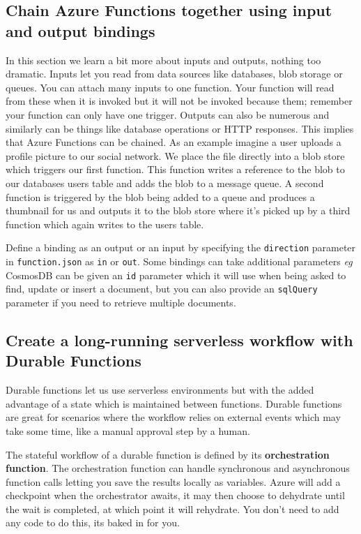 \documentclass{article}
\newcommand{\code}{\texttt}
\begin{document}
\subsection{Chain Azure Functions together using input and output bindings}
In this section we learn a bit more about inputs and outputs, nothing too dramatic. Inputs let you read from data sources like databases, blob storage or queues. You can attach many inputs to one function. Your function will read from these when it is invoked but it will not be invoked because them; remember your function can only have one trigger. Outputs can also be numerous and similarly can be things like database operations or HTTP responses. This implies that Azure Functions can be chained. As an example imagine a user uploads a profile picture to our social network. We place the file directly into a blob store which triggers our first function. This function writes a reference to the blob to our databases users table and adds the blob to a message queue. A second function is triggered by the blob being added to a queue and produces a thumbnail for us and outputs it to the blob store where it's picked up by a third function which again writes to the users table. 

Define a binding as an output or an input by specifying the \code{direction} parameter in \code{function.json} as \code{in} or \code{out}. Some bindings can take additional parameters \textit{eg} CosmosDB can be given an \code{id} parameter which it will use when being asked to find, update or insert a document, but you can also provide an \code{sqlQuery} parameter if you need to retrieve multiple documents. 

\subsection{Create a long-running serverless workflow with Durable Functions}
Durable functions let us use serverless environments but with the added advantage of a state which is maintained between functions. Durable functions are great for scenarios where the workflow relies on 
external events which may take some time, like a manual approval step by a human.

The stateful workflow of a durable function is defined by its \textbf{orchestration function}. The orchestration function can handle synchronous and asynchronous function calls letting you save the results locally as variables. Azure will add a checkpoint when the orchestrator awaits, it may then choose to dehydrate until the wait is completed, at which point it will rehydrate. You don't need to add any code to do this, its baked in for you.
\end{document}
